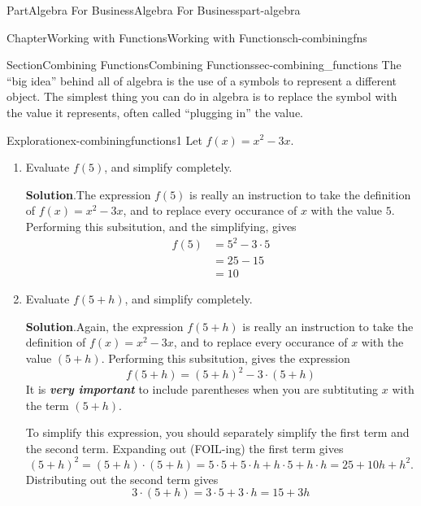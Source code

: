 \documentclass[oneside,10pt,]{tufte-book}
\newcommand{\blocktitlefont}{\relax}
\newcommand{\alert}[1]{\textbf{\textit{#1}}}
\numberwithin{equation}{chapter}
\newcommand{\amp}{&}
\begin{document}
\begin{partptx}{Part}{Algebra For Business}{}{Algebra For Business}{}{}{part-algebra}
\begin{chapterptx}{Chapter}{Working with Functions}{}{Working with Functions}{}{}{ch-combiningfns}
%
\begin{sectionptx}{Section}{Combining Functions}{}{Combining Functions}{}{}{sec-combining_functions}
The ``big idea'' behind all of algebra is the use of a symbols to represent a different object. The simplest thing you can do in algebra is to replace the symbol with the value it represents, often called ``plugging in''  the value.%
\begin{exploration}{Exploration}{}{ex-combiningfunctions1}%
Let \(f(x) = x^2 - 3x\).%
\begin{enumerate}[font=\bfseries,label=(\alph*),ref=\alph*]%
\item{}Evaluate \(f(5)\), and simplify completely.%
\par\smallskip%
\noindent\textbf{\blocktitlefont Solution}.\hypertarget{ex-combiningfunctions1-2-2}{}\quad{}The expression \(f(5)\) is really an instruction to take the definition of \(f(x) = x^2 - 3x\), and to replace every occurance of \(x\) with the value \(5\).  Performing this subsitution, and the simplifying, gives%
\begin{align*}
f(5) \amp= 5^2 - 3\cdot 5\\
\amp= 25 - 15\\
\amp= 10
\end{align*}
%
\item{}Evaluate \(f(5+h)\), and simplify completely.%
\par\smallskip%
\noindent\textbf{\blocktitlefont Solution}.\hypertarget{ex-combiningfunctions1-3-2}{}\quad{}Again, the expression \(f(5+h)\) is really an instruction to take the definition of \(f(x) = x^2 - 3x\), and to replace every occurance of \(x\) with the value \((5+h)\).  Performing this subsitution, gives the expression%
\begin{equation*}
f(5+h) = (5+h)^2 - 3\cdot (5+h)
\end{equation*}
It is \alert{very important} to include parentheses when you are subtituting \(x\) with the term \((5+h)\).%
\par
To simplify this expression, you should separately simplify the first term and the second term.  Expanding out (FOIL-ing) the first term gives%
\begin{equation*}
(5+h)^2 = (5+h)\cdot(5+h) = 5\cdot 5 + 5\cdot h + h\cdot 5 + h\cdot h = 25 + 10h +h^2\text{.}
\end{equation*}
Distributing out the second term gives%
\begin{equation*}
3\cdot (5+h) = 3\cdot 5 + 3\cdot h = 15 + 3h
\end{equation*}

\end{enumerate}
\end{exploration}
\end{sectionptx}
\end{chapterptx}
\end{partptx}
\end{document}
